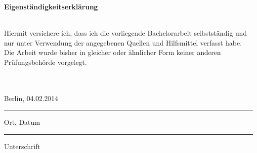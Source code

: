 \documentclass[a4paper,11pt,oneside,%
headsepline,												%
footsepline,												%
bibtotocnumbered									%
]{scrreprt}
\begin{document}
\hfil\\\\\\

\begin{LARGE}
\textbf{Eigenständigkeitserklärung}\\\\
\end{LARGE} 
Hiermit versichere ich, dass ich die vorliegende Bachelorarbeit selbstständig und nur
unter Verwendung der angegebenen Quellen und Hilfsmittel verfasst habe. Die Arbeit
wurde bisher in gleicher oder ähnlicher Form keiner anderen Prüfungsbehörde vorgelegt.\\\\\\

\parbox{4cm}{\centering Berlin, 04.02.2014\hrule
\strut \centering\footnotesize Ort, Datum} \hfill\parbox{4cm}{\hrule
\strut \centering\footnotesize Unterschrift}
\end{document}
